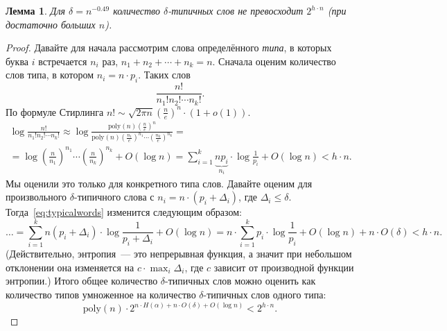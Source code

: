 \documentclass[12pt]{article}
\newcommand{\poly}{\mathrm{poly}}
\theoremstyle{definition}
\theoremstyle{plain}
\newtheorem{lemma}{Лемма}[section]
\theoremstyle{remark}
\begin{document}
\begin{lemma}\label{lm:typicalcount}
    Для $\delta = n^{-0.49}$ количество $\delta$-типичных слов не превосходит
    $2^{h\cdot n}$ (при достаточно больших $n$).
\end{lemma}
\begin{proof}
    Давайте для начала рассмотрим слова определённого \emph{типа}, в которых
    буква $i$ встречается $n_i$ раз, $n_1+n_2+\dotsb + n_k = n$. Сначала оценим
    количество слов типа, в котором $n_i = n\cdot p_i$. Таких слов
    \[
        \frac{n!}{n_1!n_2!\dotsm n_k!}.
    \]
    По формуле Стирлинга $n! \sim \sqrt{2\pi n}\left(\frac{n}{e}\right)^n\cdot(1+o(1)).$
    \begin{multline}\label{eq:typicalwords}
        \log \frac{n!}{n_1!n_2!\dotsm n_k!} \approx 
        \log \frac{\poly(n) \left(\frac{n}{e}\right)^n}
            {\poly(n)\left(\frac{n_1}{e}\right)^{n_1}\dotsm
            \left(\frac{n_k}{e}\right)^{n_k}} = \\
        = \log \left(\frac{n}{n_1}\right)^{n_1}\dotsm
            \left(\frac{n}{n_k}\right)^{n_k} + O(\log n) 
        = \sum_{i=1}^k \underbrace{np_i}_{n_i}\cdot
            \log{\textstyle\frac{1}{p_i}} + O(\log n) < h\cdot n.
    \end{multline}
    Мы оценили это только для конкретного типа слов. Давайте оценим для
    произвольного $\delta$-типичного слова с $n_i = n\cdot(p_i + \Delta_i)$,
    где $\Delta_i \le \delta$. Тогда~\eqref{eq:typicalwords} изменится следующим образом:
    \[    
        \dots = 
        \sum_{i=1}^k n(p_i + \Delta_i)\cdot
            \log{\textstyle\frac{1}{p_i + \Delta_i}} + O(\log n) =         
        n\cdot \sum_{i=1}^k p_i\cdot
            \log{\textstyle\frac{1}{p_i}} + O(\log n) + n\cdot O(\delta) < h\cdot n. 
    \]
    (Действительно, энтропия~--- это непрерывная функция, а значит при небольшом 
    отклонении она изменяется на $c\cdot \max_i\Delta_i$, где $c$ зависит от производной функции энтропии.)
    Итого общее количество $\delta$-типичных слов можно оценить как количество
    типов умноженное на количество $\delta$-типичных слов одного типа:
    \[
        \poly(n) \cdot 2^{n\cdot H(\alpha) + n\cdot O(\delta) + O(\log n)} <
        2^{h\cdot n}.   
    \]
\end{proof}
\end{document}
